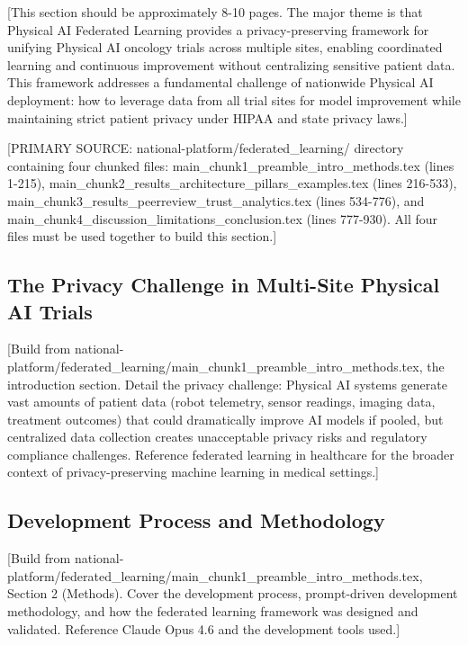 
[This section should be approximately 8-10 pages. The major theme is that
Physical AI Federated Learning \cite{fl-paper} provides a privacy-preserving
framework for unifying Physical AI oncology trials across multiple sites,
enabling coordinated learning and continuous improvement without centralizing
sensitive patient data. This framework addresses a fundamental challenge of
nationwide Physical AI deployment: how to leverage data from all trial sites
for model improvement while maintaining strict patient privacy under HIPAA
\cite{hipaa} and state privacy laws.]

[PRIMARY SOURCE: national-platform/federated\_learning/ directory containing
four chunked files: main\_chunk1\_preamble\_intro\_methods.tex (lines 1-215),
main\_chunk2\_results\_architecture\_pillars\_examples.tex (lines 216-533),
main\_chunk3\_results\_peerreview\_trust\_analytics.tex (lines 534-776), and
main\_chunk4\_discussion\_limitations\_conclusion.tex (lines 777-930). All four
files must be used together to build this section.]

\subsection{The Privacy Challenge in Multi-Site Physical AI Trials}
\label{subsec:fl-privacy}

[Build from national-platform/federated\_learning/main\_chunk1\_preamble\_intro\_methods.tex,
the introduction section. Detail the privacy challenge: Physical AI systems
generate vast amounts of patient data (robot telemetry, sensor readings,
imaging data, treatment outcomes) that could dramatically improve AI models
if pooled, but centralized data collection creates unacceptable privacy risks
and regulatory compliance challenges. Reference federated learning in
healthcare \cite{federated-learning-healthcare} for the broader context of
privacy-preserving machine learning in medical settings.]

\subsection{Development Process and Methodology}
\label{subsec:fl-methods}

[Build from national-platform/federated\_learning/main\_chunk1\_preamble\_intro\_methods.tex,
Section 2 (Methods). Cover the development process, prompt-driven development
methodology, and how the federated learning framework was designed and
validated. Reference Claude Opus 4.6 \cite{claude-opus} and the development
tools used.]

